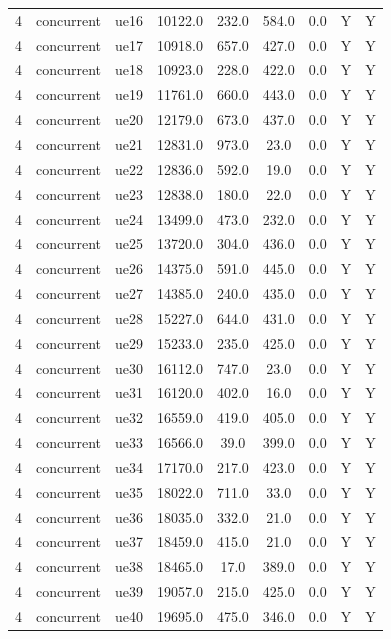 \begin{table}[ht]
\begin{tabular}{|c|c|c|c|c|c|c|c|c|}
4 & concurrent & ue16 & 10122.0 & 232.0 & 584.0 & 0.0 & Y & Y \\
4 & concurrent & ue17 & 10918.0 & 657.0 & 427.0 & 0.0 & Y & Y \\
4 & concurrent & ue18 & 10923.0 & 228.0 & 422.0 & 0.0 & Y & Y \\
4 & concurrent & ue19 & 11761.0 & 660.0 & 443.0 & 0.0 & Y & Y \\
4 & concurrent & ue20 & 12179.0 & 673.0 & 437.0 & 0.0 & Y & Y \\
4 & concurrent & ue21 & 12831.0 & 973.0 & 23.0 & 0.0 & Y & Y \\
4 & concurrent & ue22 & 12836.0 & 592.0 & 19.0 & 0.0 & Y & Y \\
4 & concurrent & ue23 & 12838.0 & 180.0 & 22.0 & 0.0 & Y & Y \\
4 & concurrent & ue24 & 13499.0 & 473.0 & 232.0 & 0.0 & Y & Y \\
4 & concurrent & ue25 & 13720.0 & 304.0 & 436.0 & 0.0 & Y & Y \\
4 & concurrent & ue26 & 14375.0 & 591.0 & 445.0 & 0.0 & Y & Y \\
4 & concurrent & ue27 & 14385.0 & 240.0 & 435.0 & 0.0 & Y & Y \\
4 & concurrent & ue28 & 15227.0 & 644.0 & 431.0 & 0.0 & Y & Y \\
4 & concurrent & ue29 & 15233.0 & 235.0 & 425.0 & 0.0 & Y & Y \\
4 & concurrent & ue30 & 16112.0 & 747.0 & 23.0 & 0.0 & Y & Y \\
4 & concurrent & ue31 & 16120.0 & 402.0 & 16.0 & 0.0 & Y & Y \\
4 & concurrent & ue32 & 16559.0 & 419.0 & 405.0 & 0.0 & Y & Y \\
4 & concurrent & ue33 & 16566.0 & 39.0 & 399.0 & 0.0 & Y & Y \\
4 & concurrent & ue34 & 17170.0 & 217.0 & 423.0 & 0.0 & Y & Y \\
4 & concurrent & ue35 & 18022.0 & 711.0 & 33.0 & 0.0 & Y & Y \\
4 & concurrent & ue36 & 18035.0 & 332.0 & 21.0 & 0.0 & Y & Y \\
4 & concurrent & ue37 & 18459.0 & 415.0 & 21.0 & 0.0 & Y & Y \\
4 & concurrent & ue38 & 18465.0 & 17.0 & 389.0 & 0.0 & Y & Y \\
4 & concurrent & ue39 & 19057.0 & 215.0 & 425.0 & 0.0 & Y & Y \\
4 & concurrent & ue40 & 19695.0 & 475.0 & 346.0 & 0.0 & Y & Y \\

\end{tabular}
\end{table}
